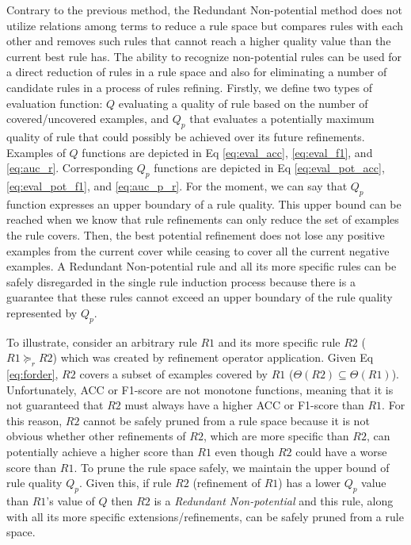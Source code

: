\documentclass{bmcart}
\begin{document}
Contrary to the previous method, the Redundant Non-potential method does not utilize relations among terms to reduce a rule space but compares rules with each other and removes such rules that cannot reach a higher quality value than the current best rule has. The ability to recognize non-potential rules can be used for a direct reduction of rules in a rule space and also for eliminating a number of candidate rules in a process of rules refining. Firstly, we define two types of evaluation function: $Q$ evaluating a quality of rule based on the number of covered/uncovered examples, and $Q_p$ that evaluates a potentially maximum quality of rule that could possibly be achieved over its future refinements. Examples of $Q$ functions are depicted in Eq \ref{eq:eval_acc}, \ref{eq:eval_f1}, and \ref{eq:auc_r}. Corresponding $Q_p$ functions are depicted in Eq \ref{eq:eval_pot_acc}, \ref{eq:eval_pot_f1}, and \ref{eq:auc_p_r}. For the moment, we can say that $Q_p$ function expresses an upper boundary of a rule quality. This upper bound can be reached when we know that rule refinements can only reduce the set of examples the rule covers. Then, the best potential refinement does not lose any positive examples from the current cover while ceasing to cover all the current negative examples.
A Redundant Non-potential rule and all its more specific rules can be safely disregarded in the single rule induction process because there is a guarantee that these rules cannot exceed an upper boundary of the rule quality represented by $Q_p$.


To illustrate, consider an arbitrary rule $R1$ and its more specific rule $R2$ ($R1 \succeq_{r} R2$) which was created by refinement operator application. Given Eq \ref{eq:forder}, $R2$ covers a subset of examples covered by $R1$ ($\Theta(R2) \subseteq \Theta(R1)$). Unfortunately, ACC or F1-score are not monotone functions, meaning that it is not guaranteed that $R2$ must always have a higher ACC or F1-score than $R1$. For this reason, $R2$ cannot be safely pruned from a rule space because it is not obvious whether other refinements of $R2$, which are more specific than $R2$, can potentially achieve a higher score than $R1$ even though $R2$ could have a worse score than $R1$. To prune the rule space safely, we maintain the upper bound of rule quality $Q_p$. Given this, if rule $R2$ (refinement of $R1$) has a lower $Q_p$ value than $R1$'s value of $Q$ then $R2$ is a \emph{Redundant Non-potential} and this rule, along with all its more specific extensions/refinements, can be safely pruned from a rule space.
\end{document}
